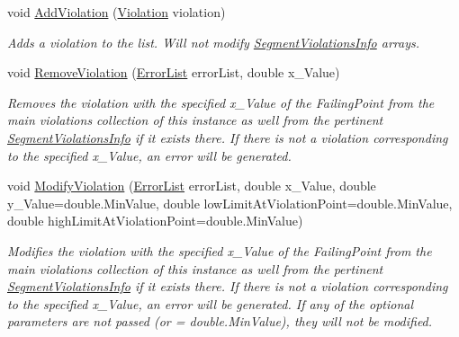 \begin{DoxyCompactItemize}
\item 
void \mbox{\hyperlink{struct_c_s_i_1_1_library_1_1_array_utilities_1_1_array_limit_checks_1_1_violations_info_ae370673193b260ed44f49428ad47f71d}{Add\+Violation}} (\mbox{\hyperlink{class_c_s_i_1_1_library_1_1_array_utilities_1_1_array_limit_checks_1_1_violation}{Violation}} violation)
\begin{DoxyCompactList}\small\item\em Adds a violation to the list. Will not modify \mbox{\hyperlink{class_c_s_i_1_1_library_1_1_array_utilities_1_1_array_limit_checks_1_1_segment_violations_info}{Segment\+Violations\+Info}} arrays. \end{DoxyCompactList}\item 
void \mbox{\hyperlink{struct_c_s_i_1_1_library_1_1_array_utilities_1_1_array_limit_checks_1_1_violations_info_a258029fab0b15bddf49e57a00b1a8553}{Remove\+Violation}} (\mbox{\hyperlink{class_c_s_i_1_1_library_1_1_errors_1_1_error_list}{Error\+List}} error\+List, double x\+\_\+\+Value)
\begin{DoxyCompactList}\small\item\em Removes the violation with the specified x\+\_\+\+Value of the Failing\+Point from the main violations collection of this instance as well from the pertinent \mbox{\hyperlink{class_c_s_i_1_1_library_1_1_array_utilities_1_1_array_limit_checks_1_1_segment_violations_info}{Segment\+Violations\+Info}} if it exists there. If there is not a violation corresponding to the specified x\+\_\+\+Value, an error will be generated. \end{DoxyCompactList}\item 
void \mbox{\hyperlink{struct_c_s_i_1_1_library_1_1_array_utilities_1_1_array_limit_checks_1_1_violations_info_ac8810869d724d19a43cb5cfa9f318e96}{Modify\+Violation}} (\mbox{\hyperlink{class_c_s_i_1_1_library_1_1_errors_1_1_error_list}{Error\+List}} error\+List, double x\+\_\+\+Value, double y\+\_\+\+Value=double.\+Min\+Value, double low\+Limit\+At\+Violation\+Point=double.\+Min\+Value, double high\+Limit\+At\+Violation\+Point=double.\+Min\+Value)
\begin{DoxyCompactList}\small\item\em Modifies the violation with the specified x\+\_\+\+Value of the Failing\+Point from the main violations collection of this instance as well from the pertinent \mbox{\hyperlink{class_c_s_i_1_1_library_1_1_array_utilities_1_1_array_limit_checks_1_1_segment_violations_info}{Segment\+Violations\+Info}} if it exists there. If there is not a violation corresponding to the specified x\+\_\+\+Value, an error will be generated. If any of the optional parameters are not passed (or = double.\+Min\+Value), they will not be modified. \end{DoxyCompactList}\item 

\end{DoxyCompactItemize}
